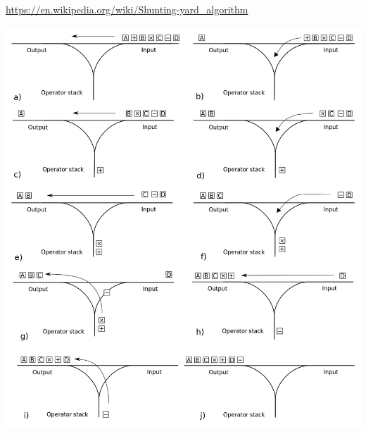\begin{frame}[fragile]
\begin{columns}[T]
\pause
\begin{column}{0.45\textwidth}
{\tiny
\url{https://en.wikipedia.org/wiki/Shunting-yard_algorithm}
}
\begin{center}
\includegraphics[height=0.7\textheight]{../Images/Shunting_yard.png}
\end{center}
\end{column}

\end{columns}
\end{frame}



